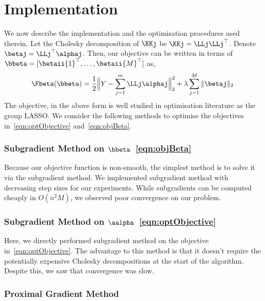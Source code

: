 
\section{Implementation}
\label{sec:implementation}

We now describe the implementation and the optimisation procedures used therein.
Let the Cholesky decomposition of $\KKj$ be $\KKj = \LLj \LLj^\top$. 
Denote $\betaj = \LLj^\top \alphaj$.
Then, our objective can be written in terms of $\bbeta = [{\betaii{1}}^\top,
\dots, {\betaii{M}}^\top]$ as,
\begin{equation}
\Fbeta(\bbeta) =  \frac{1}{2}\Big\|Y - \sum_{j=1}^m \LLj \alphaj\Big\|_2^2 + 
  \lambda \sum_{j=1}^M \|\betaj\|_2
\label{eqn:objBeta}
\end{equation}
The objective, in the above form is well studied in optimisation literature as the group
LASSO. 
We consider the following methods to optimise the objectives
in~\eqref{eqn:optObjective} and~\eqref{eqn:objBeta}.

\subsubsection*{Subgradient Method on $\bbeta$~\eqref{eqn:objBeta}}
Because our objective function is non-smooth, the simplest method is to solve it via 
the subgradient method. We implemented subgradient method with 
decreasing step sizes for our experiments. 
While subgradients can be computed cheaply in $O(n^2M)$, we observed poor 
convergence on our problem. %

\subsubsection*{Subgradient Method on $\aalpha$~\eqref{eqn:optObjective}}
Here, we directly performed subgradient method on the objective
in~\eqref{eqn:optObjective}. The advantage to this method is that it doesn't
require the potentially expensive Cholesky decompositions at the start of the
algorithm. Despite this, we saw that convergence was slow.

\subsubsection*{Proximal Gradient Method}

